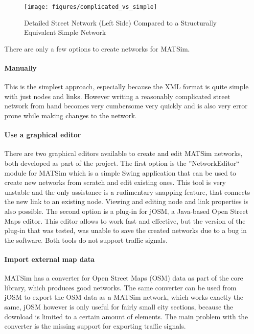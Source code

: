 \begin{figure}[ht!]
	\centering
	\texttt{[image: figures/complicated\_vs\_simple]}
	\caption{Detailed Street Network (Left Side) Compared to a Structurally Equivalent Simple Network}
	\label{complicated_vs_simple}
\end{figure}

There are only a few options to create networks for MATSim.

\paragraph{Manually} This is the simplest approach, especially because the XML format is quite simple with just nodes and links. However writing a reasonably complicated street network from hand becomes very cumbersome very quickly and is also very error prone while making changes to the network.

\paragraph{Use a graphical editor} There are two graphical editors available to create and edit MATSim networks, both developed as part of the project. The first option is the ''NetworkEditor`` module for MATSim which is a simple Swing application that can be used to create new networks from scratch and edit existing ones. This tool is very unstable and the only assistance is a rudimentary snapping feature, that connects the new link to an existing node. Viewing and editing node and link properties is also possible. The second option is a plug-in for jOSM, a Java-based Open Street Maps editor. This editor allows to work fast and effective, but the version of the plug-in that was tested, was unable to save the created networks due to a bug in the software. Both tools do not support traffic signals.

\paragraph{Import external map data} MATSim has a converter for Open Street Maps (OSM) data as part of the core library, which produces good networks. The same converter can be used from jOSM to export the OSM data as a MATSim network, which works exactly the same, jOSM however is only useful for fairly small city sections, because the download is limited to a certain amount of elements. The main problem with the converter is the missing support for exporting traffic signals.

